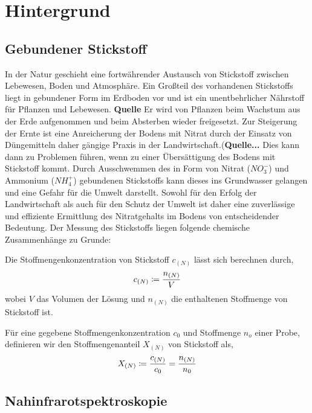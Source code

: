 \section{Hintergrund}
\label{sec:Hintergrund}
	
	\subsection{Gebundener Stickstoff}
	\label{ssec:Gebundener Stickstoff}
	
	In der Natur geschieht eine fortwährender Austausch von Stickstoff zwischen Lebewesen, Boden und Atmosphäre. 
	Ein Großteil des vorhandenen Stickstoffs liegt in gebundener Form im Erdboden vor und ist ein unentbehrlicher Nährstoff für Pflanzen und Lebewesen. \textbf{Quelle}
	Er wird von Pflanzen beim Wachstum aus der Erde aufgenommen und beim Absterben wieder freigesetzt.
    Zur Steigerung der Ernte ist eine Anreicherung der Bodens mit Nitrat durch der Einsatz von Düngemitteln daher gängige Praxis in der Landwirtschaft.(\textbf{Quelle...}
    Dies kann dann zu Problemen führen, wenn zu einer Übersättigung des Bodens mit Stickstoff kommt.
    Durch Ausschwemmen des in Form von Nitrat ($NO_3^-$) und Ammonium ($NH_4^+$) gebundenen Stickstoffs kann dieses ins Grundwasser gelangen und eine Gefahr für die Umwelt darstellt.
    Sowohl für den Erfolg der Landwirtschaft als auch für den Schutz der Umwelt ist daher eine zuverlässige und effiziente Ermittlung des Nitratgehalts im Bodens von entscheidender Bedeutung.
    Der Messung des Stickstoffs liegen folgende chemische Zusammenhänge zu Grunde:
    
    
    Die Stoffmengenkonzentration von Stickstoff $c_{(N)}$ lässt sich berechnen durch,
    	\[
			c_{(N)} \coloneqq \frac{n_{(N)}}{V}
		\]
		wobei $V$ das Volumen der Lösung und $n_{(N)}$ die enthaltenen Stoffmenge von Stickstoff ist.
		
    Für eine gegebene Stoffmengenkonzentration $c_0$  und Stoffmenge $n_o$ einer Probe, definieren wir den Stoffmengenanteil $X_{(N)}$ von Stickstoff als,
        \[
			X_{(N)} \coloneqq \frac{c_{(N)}}{c_0} = \frac{n_{(N)}}{n_0}
		\]
   

	\subsection{Nahinfrarotspektroskopie}
	\label{ssec:nirs}
	
